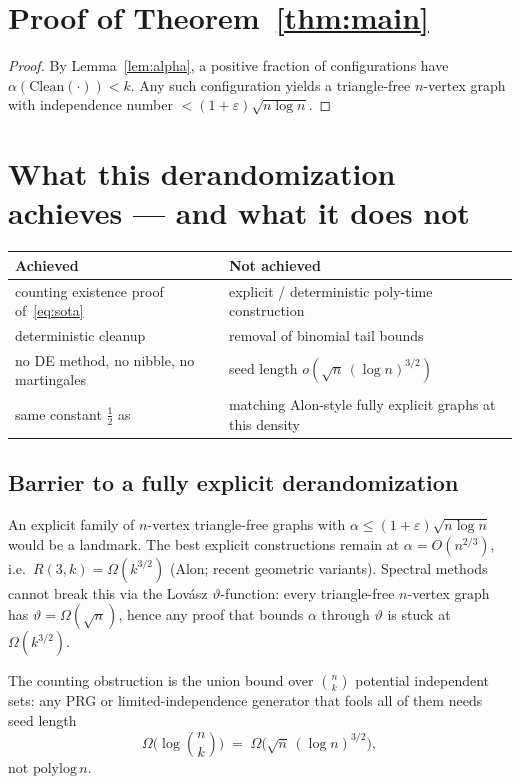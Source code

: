 \documentclass[11pt]{article}
\theoremstyle{definition}
\newcommand{\bin}[2]{\binom{#1}{#2}}
\newcommand{\eps}{\varepsilon}
\begin{document}
\section{Proof of Theorem~\ref{thm:main}}

\begin{proof}
By Lemma~\ref{lem:alpha}, a positive fraction of configurations have $\alpha(\mathrm{Clean}(\cdot))<k$.
Any such configuration yields a triangle-free $n$-vertex graph with independence number $<(1+\eps)\sqrt{n\log n}$.
\end{proof}

\section{What this derandomization achieves --- and what it does not}

\begin{center}
\begin{tabular}{lp{}}
\hline
Achieved & Not achieved \\
\hline
counting existence proof of~\eqref{eq:sota} & explicit / deterministic poly-time construction \\
deterministic cleanup & removal of binomial tail bounds \\
no DE method, no nibble, no martingales & seed length $o(\sqrt{n}\,(\log n)^{3/2})$ \\
same constant $\tfrac12$ as~\cite{HHKP2025} & matching Alon-style fully explicit graphs at this density \\
\hline
\end{tabular}
\end{center}

\subsection{Barrier to a fully explicit derandomization}

An explicit family of $n$-vertex triangle-free graphs with $\alpha\le(1+\eps)\sqrt{n\log n}$ would be a landmark.
The best explicit constructions remain at $\alpha=O(n^{2/3})$, i.e.\ $R(3,k)=\Omega(k^{3/2})$ (Alon; recent geometric variants).
Spectral methods cannot break this via the Lov\'asz $\vartheta$-function: every triangle-free $n$-vertex graph has $\vartheta=\Omega(\sqrt{n})$, hence any proof that bounds $\alpha$ through $\vartheta$ is stuck at $\Omega(k^{3/2})$.

The counting obstruction is the union bound over $\bin{n}{k}$ potential independent sets: any PRG or limited-independence generator that fools all of them needs seed length
\[
  \Omega\bigl(\log\bin{n}{k}\bigr)\;=\;\Omega\bigl(\sqrt{n}\,(\log n)^{3/2}\bigr),
\]
not $\mathrm{polylog}\,n$.
\end{document}
